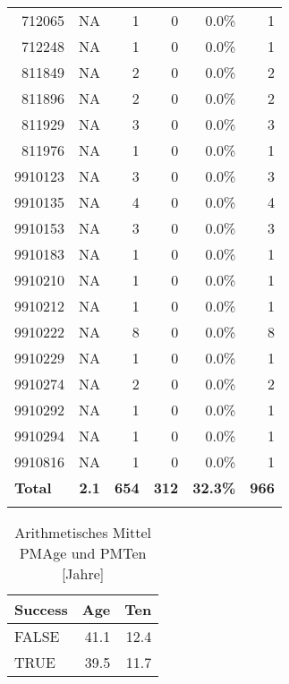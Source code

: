 \begin{longtable}{lrrrrr}
	\multicolumn{1}{r}{712065} & NA    & 1     & 0     & 0.0\% & 1 \\
	\multicolumn{1}{r}{712248} & NA    & 1     & 0     & 0.0\% & 1 \\
	\multicolumn{1}{r}{811849} & NA    & 2     & 0     & 0.0\% & 2 \\
	\multicolumn{1}{r}{811896} & NA    & 2     & 0     & 0.0\% & 2 \\
	\multicolumn{1}{r}{811929} & NA    & 3     & 0     & 0.0\% & 3 \\
	\multicolumn{1}{r}{811976} & NA    & 1     & 0     & 0.0\% & 1 \\
	\multicolumn{1}{r}{9910123} & NA    & 3     & 0     & 0.0\% & 3 \\
	\multicolumn{1}{r}{9910135} & NA    & 4     & 0     & 0.0\% & 4 \\
	\multicolumn{1}{r}{9910153} & NA    & 3     & 0     & 0.0\% & 3 \\
	\multicolumn{1}{r}{9910183} & NA    & 1     & 0     & 0.0\% & 1 \\
	\multicolumn{1}{r}{9910210} & NA    & 1     & 0     & 0.0\% & 1 \\
	\multicolumn{1}{r}{9910212} & NA    & 1     & 0     & 0.0\% & 1 \\
	\multicolumn{1}{r}{9910222} & NA    & 8     & 0     & 0.0\% & 8 \\
	\multicolumn{1}{r}{9910229} & NA    & 1     & 0     & 0.0\% & 1 \\
	\multicolumn{1}{r}{9910274} & NA    & 2     & 0     & 0.0\% & 2 \\
	\multicolumn{1}{r}{9910292} & NA    & 1     & 0     & 0.0\% & 1 \\
	\multicolumn{1}{r}{9910294} & NA    & 1     & 0     & 0.0\% & 1 \\
	\multicolumn{1}{r}{9910816} & NA    & 1     & 0     & 0.0\% & 1 \\
	\textbf{Total} & \textbf{2.1} & \textbf{654} & \textbf{312} & \textbf{32.3\%} & \textbf{966} \\
	\label{tab:pmno}
\end{longtable}
\begin{table}[H]
	\centering
	\caption{Arithmetisches Mittel PMAge und PMTen [Jahre]}
	\begin{tabular}{lrr}
		\textbf{Success} & \multicolumn{1}{l}{\textbf{Age}} & \multicolumn{1}{l}{\textbf{Ten}} \\\hline
		FALSE & 41.1 & 12.4 \\
		TRUE  & 39.5 & 11.7 \\
	\end{tabular}%
	\label{ageten}%
\end{table}%

